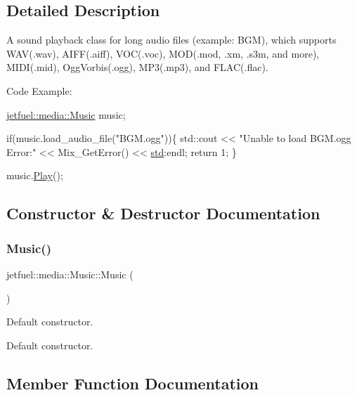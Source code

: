 \subsection{Detailed Description}
A sound playback class for long audio files (example\+: B\+GM), which supports W\+AV(.wav), A\+I\+FF(.aiff), V\+OC(.voc), M\+OD(.mod, .xm, .s3m, and more), M\+I\+DI(.mid), Ogg\+Vorbis(.ogg), M\+P3(.mp3), and F\+L\+AC(.flac).

Code Example\+: 
\begin{DoxyCode}
\hyperlink{classjetfuel_1_1media_1_1Music}{jetfuel::media::Music} music;

\textcolor{keywordflow}{if}(music.load\_audio\_file(\textcolor{stringliteral}{"BGM.ogg"}))\{
    std::cout << \textcolor{stringliteral}{"Unable to load BGM.ogg Error:"} << Mix\_GetError() 
    << \hyperlink{namespacestd}{std}:endl;
    \textcolor{keywordflow}{return} 1;
\}

music.\hyperlink{classjetfuel_1_1media_1_1Music_afe9abee662a68ea9391e94e37c79945e}{Play}();
\end{DoxyCode}
 

\subsection{Constructor \& Destructor Documentation}
\mbox{\label{classjetfuel_1_1media_1_1Music_aa3adce621c89ea9915bd6d13648ac5de}} 
\subsubsection{\texorpdfstring{Music()}{Music()}}
{\footnotesize\ttfamily jetfuel\+::media\+::\+Music\+::\+Music (\begin{DoxyParamCaption}{ }\end{DoxyParamCaption})}



Default constructor. 

Default constructor. 

\subsection{Member Function Documentation}
\mbox{\label{classjetfuel_1_1media_1_1Music_a157b382df9640e2df504de9ed1beb031}} 
